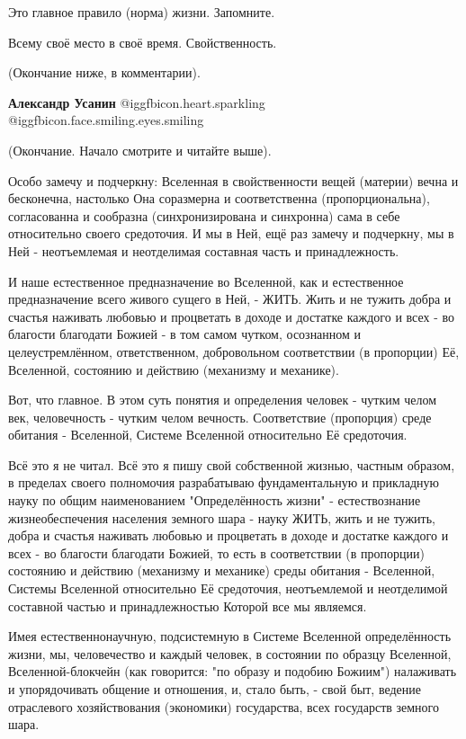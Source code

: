 \begin{itemize}
Это главное правило (норма) жизни. Запомните.

Всему своё место в своё время. Свойственность.

(Окончание ниже, в комментарии).

\begin{itemize} %
\textbf{Александр Усанин}  @igg{fbicon.heart.sparkling}  @igg{fbicon.face.smiling.eyes.smiling} 

(Окончание. Начало смотрите и читайте выше).

Особо замечу и подчеркну: Вселенная в свойственности вещей (материи) вечна и
бесконечна, настолько Она соразмерна и соответственна (пропорциональна),
согласованна и сообразна (синхронизирована и синхронна) сама в себе
относительно своего средоточия. И мы в Ней, ещё раз замечу и подчеркну, мы в
Ней - неотъемлемая и неотделимая составная часть и принадлежность.

И наше естественное предназначение во Вселенной, как и естественное
предназначение всего живого сущего в Ней, - ЖИТЬ. Жить и не тужить добра и
счастья наживать любовью и процветать в доходе и достатке каждого и всех - во
благости благодати Божией - в том самом чутком, осознанном и целеустремлённом,
ответственном, добровольном соответствии (в пропорции) Её, Вселенной, состоянию
и действию (механизму и механике).

Вот, что главное. В этом суть понятия и определения человек - чутким челом век,
человечность - чутким челом вечность. Соответствие (пропорция) среде обитания -
Вселенной, Системе Вселенной относительно Её средоточия.

Всё это я не читал. Всё это я пишу свой собственной жизнью, частным образом, в
пределах своего полномочия разрабатываю фундаментальную и прикладную науку по
общим наименованием "Определённость жизни" - естествознание жизнеобеспечения
населения земного шара - науку ЖИТЬ, жить и не тужить, добра и счастья наживать
любовью и процветать в доходе и достатке каждого и всех - во благости благодати
Божией, то есть в соответствии (в пропорции) состоянию и действию (механизму и
механике) среды обитания - Вселенной, Системы Вселенной относительно Её
средоточия, неотъемлемой и неотделимой составной частью и принадлежностью
Которой все мы являемся.

Имея естественнонаучную, подсистемную в Системе Вселенной определённость жизни,
мы, человечество и каждый человек, в состоянии по образцу Вселенной,
Вселенной-блокчейн (как говорится: "по образу и подобию Божиим") налаживать и
упорядочивать общение и отношения, и, стало быть, - свой быт, ведение
отраслевого хозяйствования (экономики) государства, всех государств земного
шара.


\end{itemize}
\end{itemize}
